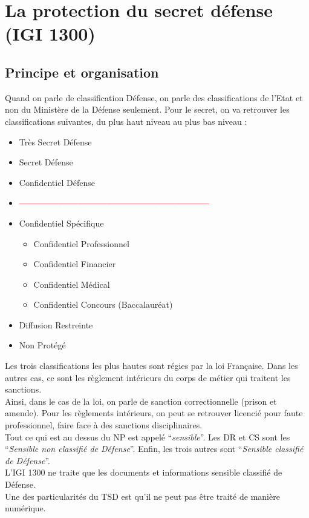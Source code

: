 \section{La protection du secret défense (IGI 1300)}
\subsection{Principe et organisation}
Quand on parle de classification Défense, on parle des classifications de l'Etat et non du Ministère de la Défense seulement. Pour le secret, on va retrouver les classifications suivantes, du plus haut niveau au plus bas niveau :
\begin{itemize}
 \item Très Secret Défense
 \item Secret Défense
 \item Confidentiel Défense
 \item[~] \textbf{\textcolor{red}{-----------------------------------------------------------}}
 \item Confidentiel Spécifique
 \begin{itemize}
  \item Confidentiel Professionnel
  \item Confidentiel Financier
  \item Confidentiel Médical
  \item Confidentiel Concours (Baccalauréat)
 \end{itemize}
 \item Diffusion Restreinte
 \item Non Protégé
\end{itemize}
Les trois classifications les plus hautes sont régies par la loi Française. Dans les autres cas, ce sont les règlement intérieurs du corps de métier qui traitent les sanctions.\\
Ainsi, dans le cas de la loi, on parle de sanction correctionnelle (prison et amende). Pour les règlements intérieurs, on peut se retrouver licencié pour faute professionnel, faire face à des sanctions disciplinaires.\\
Tout ce qui est au dessus du NP est appelé \enquote{\textit{sensible}}. Les DR et CS sont les \enquote{\textit{Sensible non classifié de Défense}}. Enfin, les trois autres sont \enquote{\textit{Sensible classifié de Défense}}.\\
L'IGI 1300 ne traite que les documents et informations sensible classifié de Défense.\\
Une des particularités du TSD est qu'il ne peut pas être traité de manière numérique.\\
